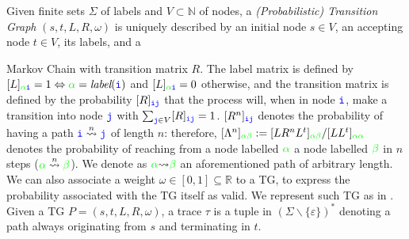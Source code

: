 Given finite sets $\Sigma$ of labels and $V\subset \mathbb{N}$ of nodes,  a \emph{(Probabilistic) Transition Graph} 
$(s,t,L,R,\omega)$ \cite{GartnerFW03} is uniquely described by an initial node $s\in V$, an accepting node $t\in V$, its labels, 
and a {Markov Chain with transition matrix $R$. The label matrix is defined by $[L]_{{\color{green}\alpha}\texttt{\color{blue}i}}=1\Leftrightarrow {\color{green}\alpha}=\textit{label}(\texttt{\color{blue}i})$ and $[L]_{{\color{green}\alpha}\texttt{\color{blue}i}}=0$ otherwise, and the transition matrix is defined by the probability $[R]_{\texttt{\color{blue}ij}}$ that the process will, when in node $\texttt{\color{blue}i}$, make a transition into node $\texttt{\color{blue}j}$ \cite{Prob} with $\sum_{\texttt{\color{blue}j}\in V}[R]_{\color{blue}\texttt{ij}}=1$. $[R^n]_{\texttt{\color{blue}ij}}$ denotes the probability of having a path $\texttt{\color{blue}i}\overset{n}{\rightsquigarrow}\texttt{\color{blue}j}$ of length $n$: therefore, $[\Lambda^n]_{\color{green}\alpha\beta}:=[LR^nL^t]_{\color{green}\alpha\beta}/[LL^t]_{\color{green}\alpha\alpha}$ denotes the probability of reaching
from a node labelled $\color{green}\alpha$ a node labelled $\color{green}\beta$ in $n$ steps (${\color{green}\alpha}\overset{n}{\rightsquigarrow}{\color{green}\beta}$). We denote as ${\color{green}\alpha}{\rightsquigarrow}{\color{green}\beta}$ an aforementioned path of arbitrary length. 
We can also associate a weight $\omega\in[0,1]\subseteq\mathbb{R}$ to a TG, to express the probability associated with the TG itself as valid. We represent such TG as in \cite{Myers1989}.
%
 Given a TG $P=(s,t,L,R,\omega)$, a trace $\tau$ is a tuple in $(\Sigma\backslash\{\varepsilon\})^*$ denoting a path always originating from $s$ and terminating in $t$. 


}
